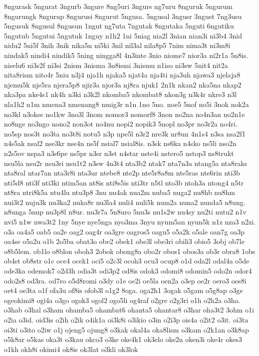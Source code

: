 {8ngurask 5ngurat 3ngurb 3ngure 8ng5uri 3ngurs ng7uru 8nguruk 5ngurum
8ngurungk 8ngurup 8ngurusi 8ngurut 5ngusa. 5ngusal 3ngusr 3ngust 7ng3usu
5ngusuk 8ngusul 8ngusun 1ngut ng7uta 7ngutak 8ngutaka 5nguti 6ngutiku
5ngutub 5ngutui 5ngutuk 1nguy n1h2 1ni 5niag nia2l 3nian nian3i ni3b4 3nid
nidu2 5ni5f 3nih 3nik nika5n ni5ki 3nil nil3al nila8p5 7nim nima3t ni3m8i
nindak5 nindi4 nindik5 5ning ningga8l 4n3inte 3nio niome7 nior3a ni2r1a
5n8is. niselu6 ni3s2f ni3si 2nism 3nisma 3n8ismi 3nismu n1iso ni3sw 5nit4
nit2a nita8rism nito4r 5niu n3j4 nja1h njaka5 njat4a nja4ti nja3uh njawa3
njelaja8 njemu5k nje5ra njera5p8 njir3a njor3a nj8ra njuk1 2n1k nkan2
nka5na nkap2 nka3pa nke4s1 nk4h n3ki n3k2l nkomba5 nkombat8 nkon3g n3k4r
nkre3 n3l nla1h2 n1m nmena3 nmenang8 nmig3r n1n 1no 5no. noe5 5nof no5i
3nok nok2a no3kl n3okse no1kw 3no3l 3nom nomor3 nomorf8 3non no2na no4n3an
no2n1e no8nge no3ngo nono2 non3ot no4nu nopi2 nopik3 5nopl no3pr no3r2a
no4ri. no5sp nos3t no3ta no3t8i notu5 n3p npe5l n3r2 nre3k nr8un 4n1s4
n3sa nsa2f1 n4s5ak nsal2 nse3kr nse4n ns5f nsial7 nsial8is. n3sk ns6ka
n4sko ns5li nso2n n2s5ov nspa3 n3s6pe ns5pr n3sr n3st n4star nste4i
nstero5 nstop3 ns8trukt nsu5la nsu2r nsu3ri nsu1t2 n3sw 4n3t4 nta3b2 ntak7
nta7n3a ntang5a nta8raks nta8ral ntar7an nta3r8i nta3ur ntebe8 nte2p
nte5r8a8m nte5ras nte6rin nti3b nti5d8 nti3f nti3ki ntim5an nt8is nti8s5is
nti3tr n5tl nto3b ntoh3a ntong4 n5tr nt8ra ntri8k5a ntu4lu ntu3p8 3nu
nu4ak nua2m nuba5 nuga2 nu8hb nu8hm nui3t2 nuju3k nu3ka2 nuka8r nu3la4
nuli4 nuli5k num2a nuna2 nunda5 n8ung. n8unga 5nup nu3p8l n8ur. nu3r7a
5n8uro 5nu3s nu1s2w nu4sy nu2ti nutu2 n1v nvi5 n1w nwa3t2 1ny 5nye nye5nga
nyo3ma 3nyu nyum5an nyun5k n1z nza3 n2zi. o3a oa4a5 oab5 oa2e oag2 oag4r
oa3gre oagros5 oagu5 o5a2k o5ale oan7g oa3p oa4se o5a2u o1b 2o5ba obat3o
obe2 obek1 obe3l obe3ri obili3 obio5 3obj ob7le o8b5lem. ob1lo o8blon
oboh3 2obok obong8a obo2r obos1 obos3a ob3r obra8 1obs ob4st ob8str o1c
oce4 ocek1 oci5 o2c3l ocoh3 ocu3 ocup8 o1d oda2l odal4a o5de ode3ka
odemok7 o2d3h odia3t odi3p2 od8is odok3 odomi8 odomin5 odo2n odor4 odo2s8
od3ra. od7ro o5d8romi o3dy o1e oe2i oe5la oen2a o3ep oe2r oero3 oes8i oet4
oe3ta o1f ofa3u of8is ofob3l o1g2 8oga. oga2h1 3ogak o5gam o5g8ap o3ge
ogeokimi8 ogi4a o3go ogok3 ogol2 ogo5li og4raf o2gre o2g3ri o1h o2h2a
o3ha. o3hab o3hal o3ham ohamba5 ohambat6 ohanta5 ohantar8 o3har oha3t2
3ohm o1i o2ia o3id. oid3is o2ih o2ik o4ik1a oi3k8i o3ikio o3in o2i3p ois4a
o2it2 o3it. oi3ta oi3ti o3ito o2iw o1j ojeng5 ojung8 o3kak okal4a oka8lism
o3kam o2k1an o3k8ap o5k8ar o5kas oka3t o3kau okco3 o3ke oke4k1 ok3elo
oke2n oken3i oke4r okes3 o1kh okh8i okimi4 ok8is ok3lat o3kli ok3lok
}
